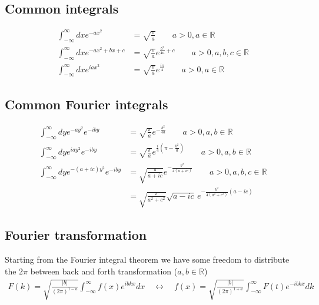 \documentclass[10pt,a4paper]{article}
\theoremstyle{definition}
\begin{document}
\subsection{Common integrals}
\begin{align}
    \int_{-\infty}^\infty dx e^{-ax^2}&=\sqrt{\frac{\pi}{a}} \qquad a>0, a\in\mathbb{R}\\
    \int_{-\infty}^\infty dx e^{-ax^2+bx+c}&=\sqrt{\frac{\pi}{a}}e^{\frac{b^2}{4a}+c} \qquad a>0, a,b,c\in\mathbb{R}\\
    \int_{-\infty}^\infty dx e^{iax^2}&=\sqrt{\frac{\pi}{a}}e^{\frac{i\pi}{4}} \qquad a>0, a\in\mathbb{R}
\end{align}
\subsection{Common Fourier integrals}
\begin{align}
    \int_{-\infty}^\infty dy e^{-ay^2}e^{-iby}&=\sqrt{\frac{\pi}{a}}e^{-\frac{b^2}{4a}} \qquad a>0, a,b\in\mathbb{R}\\
    \int_{-\infty}^\infty dy e^{iay^2}e^{-iby}&=\sqrt{\frac{\pi}{a}}e^{\frac{i}{4}\left(\pi-\frac{b^2}{a}\right)} \qquad a>0, a,b\in\mathbb{R}\\
    \int_{-\infty}^\infty dy e^{-(a+ic)y^2}e^{-iby}&=\sqrt{\frac{\pi}{a+ic}}e^{-\frac{b^2}{4(a+ic)}} \qquad a>0, a,b,c\in\mathbb{R}\\
    &=\sqrt{\frac{\pi}{a^2+c^2}}\sqrt{a-ic}\,e^{-\frac{b^2}{4(a^2+c^2)}(a-ic)}
\end{align}

\subsection{Fourier transformation}
Starting from the Fourier integral theorem we have some freedom to distribute the $2\pi$ between back and forth transformation ($a,b\in\mathbb{R}$)
\begin{align}
    F(k)=\sqrt{\frac{|b|}{(2\pi)^{1-a}}}\int_{-\infty}^\infty f(x)e^{ibkx}dx\quad\leftrightarrow\quad f(x)=\sqrt{\frac{|b|}{(2\pi)^{1+a}}}\int_{-\infty}^\infty F(t)e^{-ibkx}dk
\end{align}
\end{document}
